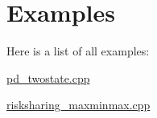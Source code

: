 \section{Examples}
Here is a list of all examples\+:\begin{DoxyCompactItemize}
\item 
\hyperlink{pd_twostate_8cpp-example}{pd\+\_\+twostate.\+cpp}
\item 
\hyperlink{risksharing_maxminmax_8cpp-example}{risksharing\+\_\+maxminmax.\+cpp}
\end{DoxyCompactItemize}
